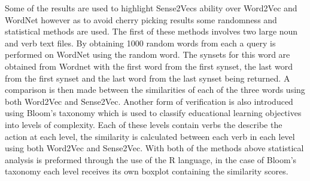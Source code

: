 Some of the results are used to highlight Sense2Vecs ability over Word2Vec and WordNet however as to avoid cherry picking results some randomness and statistical methods are used. The first of these methods involves two large noun and verb text files. By obtaining 1000 random words from each a query is performed on WordNet using the random word. The synsets for this word are obtained from Wordnet with the first word from the first synset, the last word from the first synset and the last word from the last synset being returned. A comparison is then made between the similarities of each of the three words using both Word2Vec and Sense2Vec. Another form of verification is also introduced using Bloom’s taxonomy which is used to classify educational learning objectives into levels of complexity. Each of these levels contain verbs the describe the action at each level, the similarity is calculated between each verb in each level using both Word2Vec and Sense2Vec. With both of the methods above statistical analysis is preformed through the use of the R language, in the case of Bloom’s taxonomy each level receives its own boxplot containing the similarity scores.